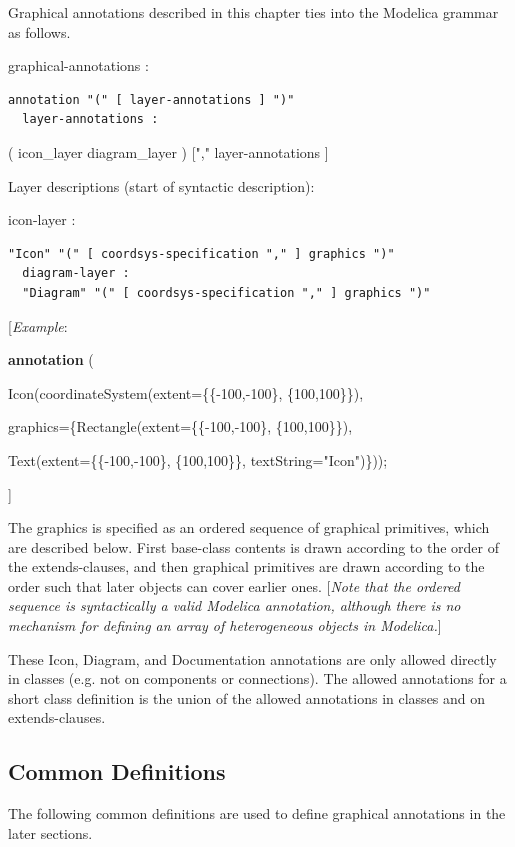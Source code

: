 \documentclass[10pt,a4paper]{report}
\def\doublelabel#1{\label{#1}\hypertarget{#1}{}}
\begin{document}
Graphical annotations described in this chapter ties into the Modelica
grammar as follows.

graphical-annotations :

\begin{lstlisting}[language=modelica]
  annotation "(" [ layer-annotations ] ")"
  layer-annotations :
\end{lstlisting}
( icon\_layer \textbar{} diagram\_layer ) {[}"," layer-annotations {]}

Layer descriptions (start of syntactic description):

icon-layer :

\begin{lstlisting}[language=modelica]
  "Icon" "(" [ coordsys-specification "," ] graphics ")"
  diagram-layer :
  "Diagram" "(" [ coordsys-specification "," ] graphics ")"
\end{lstlisting}
{[}\emph{Example}:

\textbf{annotation} (

Icon(coordinateSystem(extent=\{\{-100,-100\}, \{100,100\}\}),

graphics=\{Rectangle(extent=\{\{-100,-100\}, \{100,100\}\}),

Text(extent=\{\{-100,-100\}, \{100,100\}\}, textString="Icon")\}));

{]}

The graphics is specified as an ordered sequence of graphical
primitives, which are described below. First base-class contents is
drawn according to the order of the extends-clauses, and then graphical
primitives are drawn according to the order such that later objects can
cover earlier ones. {[}\emph{Note that the ordered sequence is
syntactically a valid Modelica annotation, although there is no
mechanism for defining an array of heterogeneous objects in
Modelica.}{]}

These Icon, Diagram, and Documentation annotations are only allowed
directly in classes (e.g. not on components or connections). The allowed
annotations for a short class definition is the union of the allowed
annotations in classes and on extends-clauses.

\subsection{Common Definitions}\doublelabel{common-definitions}

The following common definitions are used to define graphical
annotations in the later sections.
\end{document}
